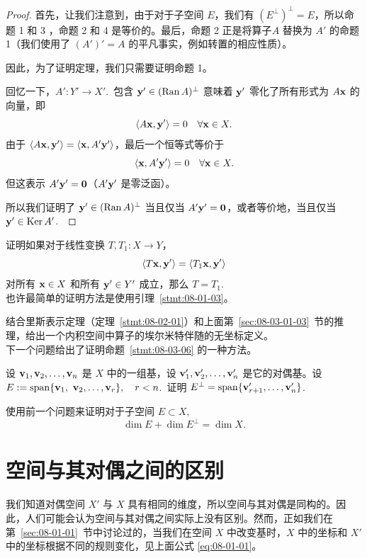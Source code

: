 \begin{proof}
首先，让我们注意到，由于对于子空间 $E$，我们有 $(E^\perp)^\perp = E$，所以命题 1 和 3 ，命题 2 和 4 是等价的。最后，命题 2 正是将算子$A$ 替换为 $A'$ 的命题 1（我们使用了 $(A')' = A$ 的平凡事实，例如转置的相应性质）。

因此，为了证明定理，我们只需要证明命题 1。

回忆一下，$A' : Y' \to X'$.~包含 $\mathbf{y}' \in (\operatorname{Ran} A)^\perp$ 意味着 $\mathbf{y}'$ 零化了所有形式为 $A\mathbf{x}$ 的向量，即 $$\langle A\mathbf{x}, \mathbf{y}' \rangle = 0\quad \forall \mathbf{x} \in X.$$
由于 $\langle A\mathbf{x}, \mathbf{y}' \rangle = \langle \mathbf{x}, A'\mathbf{y}' \rangle$，最后一个恒等式等价于 $$\langle \mathbf{x}, A'\mathbf{y}' \rangle = 0\quad \forall \mathbf{x} \in X.$$
但这表示 $A'\mathbf{y}' = \mathbf{0}$（$A'\mathbf{y}'$ 是零泛函）。

所以我们证明了 $\mathbf{y}' \in (\operatorname{Ran} A)^\perp$ 当且仅当 $A'\mathbf{y}' = \mathbf{0}$，或者等价地，当且仅当 $\mathbf{y}' \in \operatorname{Ker} A'$.~\end{proof}

\begin{problemset}
\item \label{ex:08-03-01} 证明如果对于线性变换 $T, T_1 : X \to Y$，
$$\langle T\mathbf{x}, \mathbf{y}' \rangle = \langle T_1\mathbf{x}, \mathbf{y}' \rangle$$
对所有 $\mathbf{x} \in X$ 和所有 $\mathbf{y}' \in Y'$ 成立，那么 $T = T_1$.~
\\
也许最简单的证明方法是使用引理~\ref{stmt:08-01-03}。
\item \label{ex:08-03-02} 结合里斯表示定理（定理~\ref{stmt:08-02-01}）和上面第~\ref{sec:08-03-01-03}~节的推理，给出一个内积空间中算子的埃尔米特伴随的无坐标定义。
\\
下一个问题给出了证明命题~\ref{stmt:08-03-06} 的一种方法。
\item \label{ex:08-03-03} 设 $\mathbf{v}_1, \mathbf{v}_2, \dots, \mathbf{v}_n$ 是 $X$ 中的一组基，设 $\mathbf{v}'_1, \mathbf{v}'_2, \dots, \mathbf{v}'_n$ 是它的对偶基。设 $E := \operatorname{span}\{\mathbf{v}_1, $ $\mathbf{v}_2, \dots, \mathbf{v}_r\},\quad r < n$.~证明 $E^\perp = \operatorname{span}\{\mathbf{v}'_{r+1}, \dots, \mathbf{v}'_n\}$.~
\item \label{ex:08-03-04} 使用前一个问题来证明对于子空间 $E \subset X,$
$$ \dim E + \dim E^\perp = \dim X.$$
\end{problemset}

\section{空间与其对偶之间的区别}\label{sec:08-04}

我们知道对偶空间 $X'$ 与 $X$ 具有相同的维度，所以空间与其对偶是同构的。因此，人们可能会认为空间与其对偶之间实际上没有区别。然而，正如我们在 第~\ref{sec:08-01-01}~节中讨论过的，当我们在空间 $X$ 中改变基时，$X$ 中的坐标和 $X'$ 中的坐标根据不同的规则变化，见上面公式 \eqref{eq:08-01-01}。

